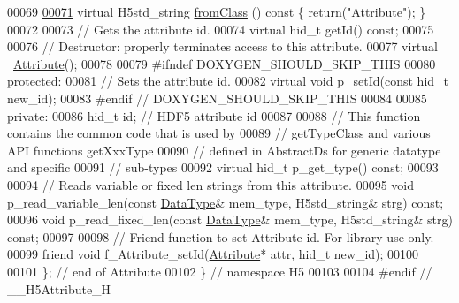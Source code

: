 \begin{DoxyCode}
00069 
\hyperlink{class_h5_1_1_attribute_a2ede405f542c51aebc38cfcadfdd7d95}{00071}         \textcolor{keyword}{virtual} H5std\_string \hyperlink{class_h5_1_1_attribute_a2ede405f542c51aebc38cfcadfdd7d95}{fromClass} ()\textcolor{keyword}{ const }\{ \textcolor{keywordflow}{return}(\textcolor{stringliteral}{"Attribute"}); \}
00072 
00073         \textcolor{comment}{// Gets the attribute id.}
00074         \textcolor{keyword}{virtual} hid\_t getId() \textcolor{keyword}{const};
00075 
00076         \textcolor{comment}{// Destructor: properly terminates access to this attribute.}
00077         \textcolor{keyword}{virtual} ~\hyperlink{class_h5_1_1_attribute}{Attribute}();
00078 
00079 \textcolor{preprocessor}{#ifndef DOXYGEN\_SHOULD\_SKIP\_THIS}
00080    \textcolor{keyword}{protected}:
00081         \textcolor{comment}{// Sets the attribute id.}
00082         \textcolor{keyword}{virtual} \textcolor{keywordtype}{void} p\_setId(\textcolor{keyword}{const} hid\_t new\_id);
00083 \textcolor{preprocessor}{#endif // DOXYGEN\_SHOULD\_SKIP\_THIS}
00084 
00085    \textcolor{keyword}{private}:
00086         hid\_t id;        \textcolor{comment}{// HDF5 attribute id}
00087 
00088         \textcolor{comment}{// This function contains the common code that is used by}
00089         \textcolor{comment}{// getTypeClass and various API functions getXxxType}
00090         \textcolor{comment}{// defined in AbstractDs for generic datatype and specific}
00091         \textcolor{comment}{// sub-types}
00092         \textcolor{keyword}{virtual} hid\_t p\_get\_type() \textcolor{keyword}{const};
00093 
00094         \textcolor{comment}{// Reads variable or fixed len strings from this attribute.}
00095         \textcolor{keywordtype}{void} p\_read\_variable\_len(\textcolor{keyword}{const} \hyperlink{class_h5_1_1_data_type}{DataType}& mem\_type, H5std\_string& strg) \textcolor{keyword}{const};
00096         \textcolor{keywordtype}{void} p\_read\_fixed\_len(\textcolor{keyword}{const} \hyperlink{class_h5_1_1_data_type}{DataType}& mem\_type, H5std\_string& strg) \textcolor{keyword}{const};
00097 
00098         \textcolor{comment}{// Friend function to set Attribute id.  For library use only.}
00099         \textcolor{keyword}{friend} \textcolor{keywordtype}{void} f\_Attribute\_setId(\hyperlink{class_h5_1_1_attribute}{Attribute}* attr, hid\_t new\_id);
00100 
00101 \}; \textcolor{comment}{// end of Attribute}
00102 \} \textcolor{comment}{// namespace H5}
00103 
00104 \textcolor{preprocessor}{#endif // \_\_H5Attribute\_H}
\end{DoxyCode}
